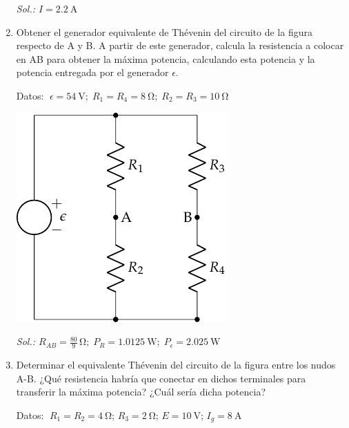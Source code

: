 \begin{enumerate}
  \emph{Sol.:\; $I=\qty{2.2}{\ampere}$}

\item Obtener el generador equivalente de Thévenin del circuito de la
  figura respecto de A y B. A partir de este generador, calcula la
  resistencia a colocar en AB para obtener la máxima potencia,
  calculando esta potencia y la potencia entregada por el generador
  $\epsilon$.

  Datos:
  $\; \epsilon = \qty{54}{\volt};\; R_1 = R_4 = \qty{8}{\ohm};\;
  R_2 = R_3 = \qty{10}{\ohm}$

  \begin{center}
    \includegraphics{../figs/Thevenin2}
  \end{center}

    \emph{Sol.:\;
      $R_{AB} = \frac{80}{9}\,\si{\ohm}; \; P_R = \qty{1.0125}{\watt}; \;
      P_\epsilon = \qty{2.025}{\watt}$}

  \item Determinar el equivalente Thévenin del circuito de la figura
    entre los nudos A-B. ¿Qué resistencia habría que conectar en
    dichos terminales para transferir la máxima potencia? ¿Cuál sería
    dicha potencia?

    Datos: $\; R_1 = R_2 = \qty{4}{\ohm}$; $R_3 = \qty{2}{\ohm}$; $E = \qty{10}{\volt}$; $I_g = \qty{8}{\ampere}$
    

\end{enumerate}
